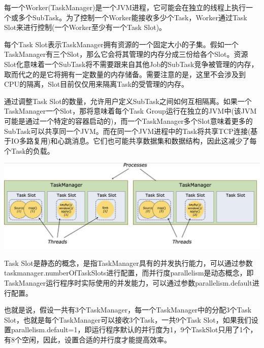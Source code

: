 \documentclass{ctexart}
\begin{document}
每一个Worker(TaskManager)是一个JVM进程，它可能会在独立的线程上执行一个或多个SubTask。为了控制一个Worker能接收多少个Task，Worker通过Task Slot来进行控制(一个Worker至少有一个Task Slot)。

每个Task Slot表示TaskManager拥有资源的一个固定大小的子集。假如一个TaskManager有三个Slot，那么它会将其管理的内存分成三份给各个Slot。资源Slot化意味着一个SubTask将不需要跟来自其他Job的SubTask竞争被管理的内存，取而代之的是它将拥有一定数量的内存储备。需要注意的是，这里不会涉及到CPU的隔离，Slot目前仅仅用来隔离Task的受管理的内存。

通过调整Task Slot的数量，允许用户定义SubTask之间如何互相隔离。如果一个TaskManager一个Slot，那将意味着每个Task Group运行在独立的JVM中(该JVM可能是通过一个特定的容器启动的)，而一个TaskManager多个Slot意味着更多的SubTask可以共享同一个JVM。而在同一个JVM进程中的Task将共享TCP连接(基于IO多路复用)和心跳消息。它们也可能共享数据集和数据结构，因此这减少了每个Task的负载。

\includegraphics[width=\textwidth]{tasks_slots.png}

Task Slot是静态的概念，是指TaskManager具有的并发执行能力，可以通过参数taskmanager.numberOfTaskSlots进行配置，而并行度parallelism是动态概念，即TaskManager运行程序时实际使用的并发能力，可以通过参数parallelism.default进行配置。

也就是说，假设一共有3个TaskManager，每一个TaskManager中的分配3个Task Slot，也就是每个TaskManager可以接收3个Task，一共9个Task Slot，如果我们设置parallelism.default=1，即运行程序默认的并行度为1，9个TaskSlot只用了1个，有8个空闲，因此，设置合适的并行度才能提高效率。
\end{document}
